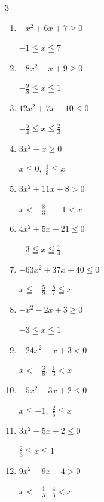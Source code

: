 \begin{multicols}{3}
\begin{enumerate}
        $\displaystyle \frac{5}{8} < x < 1$

  \item $-x^{2}+6x+7\geq 0$

        $\displaystyle -1 \leqq x \leqq 7$

  \item $-8x^{2}-x+9\geq 0$

        $\displaystyle -\frac{9}{8} \leqq x \leqq 1$

\columnbreak %

\resetques

  \item $12x^{2}+7x-10\leq 0$

        $\displaystyle -\frac{5}{4} \leqq x \leqq \frac{2}{3}$

  \item $3x^{2}-x\geq 0$

        $\displaystyle x \leqq 0 , \; \frac{1}{3} \leqq x$

  \item $3x^{2}+11x+8>0$

        $\displaystyle x < -\frac{8}{3} , \; -1 < x$

  \item $4x^{2}+5x-21\leq 0$

        $\displaystyle -3 \leqq x \leqq \frac{7}{4}$

  \item $-63x^{2}+37x+40\leq 0$

        $\displaystyle x \leqq -\frac{5}{9} , \; \frac{8}{7} \leqq x$

  \item $-x^{2}-2x+3\geq 0$

        $\displaystyle -3 \leqq x \leqq 1$

  \item $-24x^{2}-x+3<0$

        $\displaystyle x < -\frac{3}{8} , \; \frac{1}{3} < x$

  \item $-5x^{2}-3x+2\leq 0$

        $\displaystyle x \leqq -1 , \; \frac{2}{5} \leqq x$

  \item $3x^{2}-5x+2\leq 0$

        $\displaystyle \frac{2}{3} \leqq x \leqq 1$

  \item $9x^{2}-9x-4>0$

        $\displaystyle x < -\frac{1}{3} , \; \frac{4}{3} < x$


\end{enumerate}
\end{multicols}
